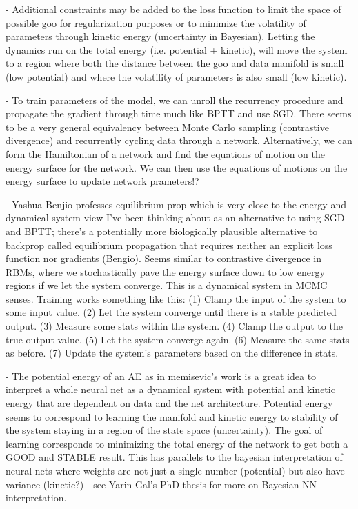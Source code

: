 \documentclass[aps,preprint,showpacs,superscriptaddress,groupedaddress]{revtex4}  %
\begin{document}
- Additional constraints may be added to the loss function to limit the space of possible goo for regularization purposes or to minimize the volatility of parameters through kinetic energy (uncertainty in Bayesian). Letting the dynamics run on the total energy (i.e. potential + kinetic), will move the system to a region where both the distance between the goo and data manifold is small (low potential) and where the volatility of parameters is also small (low kinetic).

- To train parameters of the model, we can unroll the recurrency procedure and propagate the gradient through time much like BPTT and use SGD. There seems to be a very general equivalency between Monte Carlo sampling (contrastive divergence) and recurrently cycling data through a network. Alternatively, we can form the Hamiltonian of a network and find the equations of motion on the energy surface for the network. We can then use the equations of motions on the energy surface to update network prameters!?


- Yashua Benjio professes equilibrium prop which is very close to the energy and dynamical system view I've been thinking about as an alternative to using SGD and BPTT; there’s a potentially more biologically plausible alternative to backprop called equilibrium propagation that requires neither an explicit loss function nor gradients (Bengio). Seems similar to contrastive divergence in RBMs, where we stochastically pave the energy surface down to low energy regions if we let the system converge. This is a dynamical system in MCMC senses.  Training works something like this: (1) Clamp the input of the system to some input value. (2) Let the system converge until there is a stable predicted output. (3) Measure some stats within the system. (4) Clamp the output to the true output value. (5) Let the system converge again. (6) Measure the same stats as before. (7) Update the system’s parameters based on the difference in stats. 

- The potential energy of an AE as in memisevic's work is a great idea to interpret a whole neural net as a dynamical system with potential and kinetic energy that are dependent on data and the net architecture. Potential energy seems to correspond to learning the manifold and kinetic energy to stability of the system staying in a region of the state space (uncertainty). The goal of learning corresponds to minimizing the total energy of the network to get both a GOOD and STABLE result. This has parallels to the bayesian interpretation of neural nets where weights are not just a single number (potential) but also have variance (kinetic?) - see Yarin Gal's PhD thesis for more on Bayesian NN interpretation.  
\end{document}
